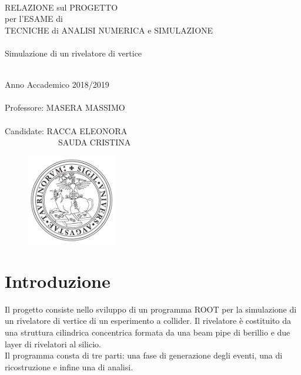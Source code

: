 \documentclass[11pt,a4paper]{article}
\begin{document}
\thispagestyle{empty}

\rmfamily
\begin{center}
\ \\
\vspace{2cm}

\LARGE{\textcolor[rgb]{1,0,0}{RELAZIONE sul PROGETTO\\ per l'ESAME di\\TECNICHE di ANALISI NUMERICA e SIMULAZIONE}\\}
\huge{\textcolor[rgb]{1,0,0}{\ \\Simulazione di un rivelatore di vertice}\\}
\hrulefill \\
\vspace{1.5cm}

\Large{Anno Accademico 2018/2019
\\ \ \\
Professore: MASERA MASSIMO
\\ \ \\ 
Candidate: RACCA ELEONORA\\
\ \ \ \ \ \ \ \ \ \ \ \ \ SAUDA CRISTINA}

\vspace{6cm}
\begin{figure}[h]
\centering
	\includegraphics[width=0.35\textwidth]{Immagini/logounito.pdf}
\end{figure}

\end{center}

\section{Introduzione}
\par Il progetto consiste nello sviluppo di un programma ROOT per la simulazione di un rivelatore di vertice di un esperimento a collider. Il rivelatore è costituito da una struttura cilindrica concentrica formata da una beam pipe di berillio e due layer di rivelatori al silicio.\\
Il programma consta di tre parti: una fase di generazione degli eventi, una di ricostruzione e infine una di analisi.
\end{document}
